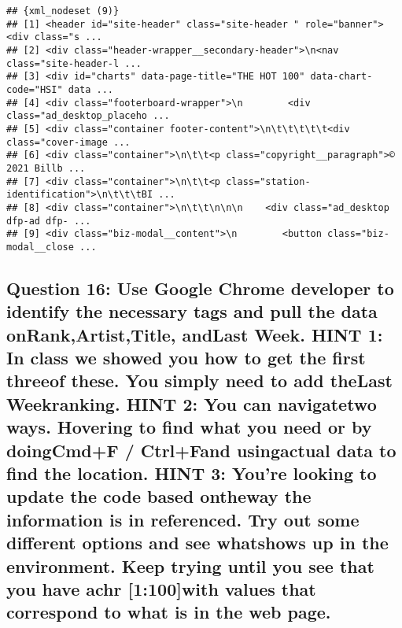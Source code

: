 \documentclass[
]{article}
\begin{document}
\begin{verbatim}
## {xml_nodeset (9)}
## [1] <header id="site-header" class="site-header " role="banner"><div class="s ...
## [2] <div class="header-wrapper__secondary-header">\n<nav class="site-header-l ...
## [3] <div id="charts" data-page-title="THE HOT 100" data-chart-code="HSI" data ...
## [4] <div class="footerboard-wrapper">\n        <div class="ad_desktop_placeho ...
## [5] <div class="container footer-content">\n\t\t\t\t\t<div class="cover-image ...
## [6] <div class="container">\n\t\t<p class="copyright__paragraph">© 2021 Billb ...
## [7] <div class="container">\n\t\t<p class="station-identification">\n\t\t\tBI ...
## [8] <div class="container">\n\t\t\n\n\n    <div class="ad_desktop dfp-ad dfp- ...
## [9] <div class="biz-modal__content">\n        <button class="biz-modal__close ...
\end{verbatim}

\hypertarget{question-16-use-google-chrome-developer-to-identify-the-necessary-tags-and-pull-the-data-onrankartisttitle-andlast-week.-hint-1-in-class-we-showed-you-how-to-get-the-first-threeof-these.-you-simply-need-to-add-thelast-weekranking.-hint-2-you-can-navigatetwo-ways.-hovering-to-find-what-you-need-or-by-doingcmdf-ctrlfand-usingactual-data-to-find-the-location.-hint-3-youre-looking-to-update-the-code-based-ontheway-the-information-is-in-referenced.-try-out-some-different-options-and-see-whatshows-up-in-the-environment.-keep-trying-until-you-see-that-you-have-achr-1100with-values-that-correspond-to-what-is-in-the-web-page.}{%
\subsection{Question 16: Use Google Chrome developer to identify the
necessary tags and pull the data onRank,Artist,Title, andLast Week. HINT
1: In class we showed you how to get the first threeof these. You simply
need to add theLast Weekranking. HINT 2: You can navigatetwo ways.
Hovering to find what you need or by doingCmd+F / Ctrl+Fand usingactual
data to find the location. HINT 3: You're looking to update the code
based ontheway the information is in referenced. Try out some different
options and see whatshows up in the environment. Keep trying until you
see that you have achr {[}1:100{]}with values that correspond to what is
in the web
page.}\label{question-16-use-google-chrome-developer-to-identify-the-necessary-tags-and-pull-the-data-onrankartisttitle-andlast-week.-hint-1-in-class-we-showed-you-how-to-get-the-first-threeof-these.-you-simply-need-to-add-thelast-weekranking.-hint-2-you-can-navigatetwo-ways.-hovering-to-find-what-you-need-or-by-doingcmdf-ctrlfand-usingactual-data-to-find-the-location.-hint-3-youre-looking-to-update-the-code-based-ontheway-the-information-is-in-referenced.-try-out-some-different-options-and-see-whatshows-up-in-the-environment.-keep-trying-until-you-see-that-you-have-achr-1100with-values-that-correspond-to-what-is-in-the-web-page.}}
\end{document}

